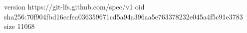 version https://git-lfs.github.com/spec/v1
oid sha256:70f904fbd16ccfea036359671cd5a94a396aa5e763378232e045a4f5c91e3783
size 11068
